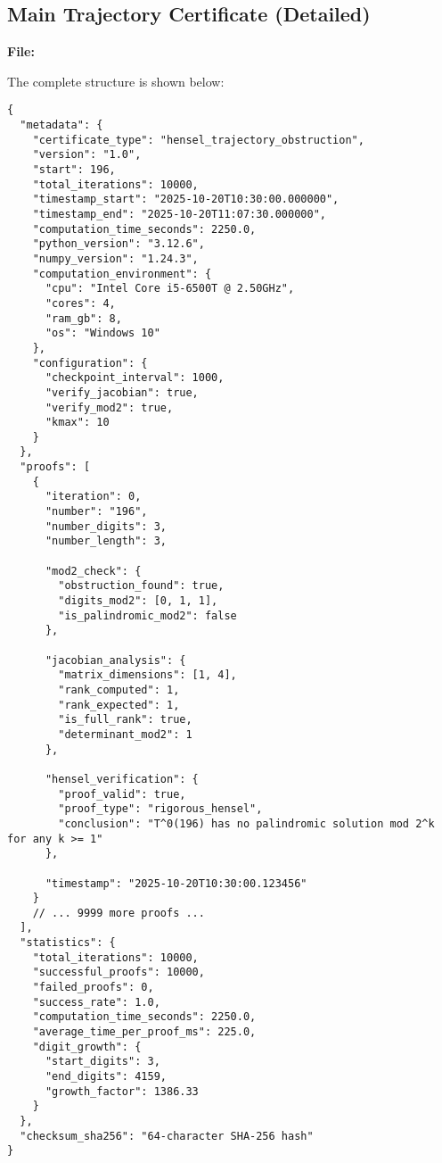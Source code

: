 \documentclass[11pt,a4paper]{article}
\theoremstyle{definition}
\newcommand{\file}[1]{\path{\detokenize{#1}}}
\begin{document}
\subsection{Main Trajectory Certificate (Detailed)}

\textbf{File:} \file{trajectory\_obstruction\_log.json}

The complete structure is shown below:

\begin{lstlisting}[style=jsonstyle, caption={Main Trajectory Certificate Structure}, label={lst:main_trajectory}]
{
  "metadata": {
    "certificate_type": "hensel_trajectory_obstruction",
    "version": "1.0",
    "start": 196,
    "total_iterations": 10000,
    "timestamp_start": "2025-10-20T10:30:00.000000",
    "timestamp_end": "2025-10-20T11:07:30.000000",
    "computation_time_seconds": 2250.0,
    "python_version": "3.12.6",
    "numpy_version": "1.24.3",
    "computation_environment": {
      "cpu": "Intel Core i5-6500T @ 2.50GHz",
      "cores": 4,
      "ram_gb": 8,
      "os": "Windows 10"
    },
    "configuration": {
      "checkpoint_interval": 1000,
      "verify_jacobian": true,
      "verify_mod2": true,
      "kmax": 10
    }
  },
  "proofs": [
    {
      "iteration": 0,
      "number": "196",
      "number_digits": 3,
      "number_length": 3,
      
      "mod2_check": {
        "obstruction_found": true,
        "digits_mod2": [0, 1, 1],
        "is_palindromic_mod2": false
      },
      
      "jacobian_analysis": {
        "matrix_dimensions": [1, 4],
        "rank_computed": 1,
        "rank_expected": 1,
        "is_full_rank": true,
        "determinant_mod2": 1
      },
      
      "hensel_verification": {
        "proof_valid": true,
        "proof_type": "rigorous_hensel",
        "conclusion": "T^0(196) has no palindromic solution mod 2^k for any k >= 1"
      },
      
      "timestamp": "2025-10-20T10:30:00.123456"
    }
    // ... 9999 more proofs ...
  ],
  "statistics": {
    "total_iterations": 10000,
    "successful_proofs": 10000,
    "failed_proofs": 0,
    "success_rate": 1.0,
    "computation_time_seconds": 2250.0,
    "average_time_per_proof_ms": 225.0,
    "digit_growth": {
      "start_digits": 3,
      "end_digits": 4159,
      "growth_factor": 1386.33
    }
  },
  "checksum_sha256": "64-character SHA-256 hash"
}
\end{lstlisting}
\end{document}
